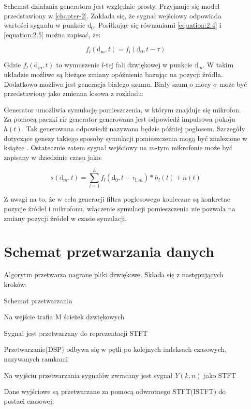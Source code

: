 Schemat działania generatora jest względnie prosty. Przyjmuje się model przedstawiony w \ref{chapter-2}. Zakłada się, że sygnał wejściowy odpowiada wartości sygnału w punkcie $\bm{\mathrm{d}}_{0}$. Posiłkując się równaniami \ref{equation:2.4} i \ref{equation:2.5} można zapisać, że:

\begin{equation}
    \label{equation:delay model}
    f_{l}(\bm{\mathrm{d}}_{m},t) = 
    f_{l}(\bm{\mathrm{d}}_{0},t-\tau)
\end{equation}

\noindent Gdzie $f_{l}(\bm{\mathrm{d}}_{m},t)$ to wymuszenie $l$-tej fali dzwiękowej w punkcie $\bm{\mathrm{d}}_{m}$. W takim układzie możliwe są bieżące zmiany opóźnienia bazując na pozycji źródła. Dodatkowo możliwa jest generacja białego szumu. Biały szum o mocy $\sigma$ może być przedstawiony jako zmienna losowa z rozkładu:


Generator umożliwia symulację pomieszczenia, w  którym znajduje się mikrofon. Za pomocą paczki rir generator \cite{rir} generowana jest odpowiedź impulsowa pokoju $h(t)$. Tak generowana odpowiedź nazywana będzie później pogłosem. Szczegóły dotyczące genezy takiego sposoby symulacji pomieszczenia mogą być znalezione w książce \cite{Kuttruff}. Ostatecznie zatem sygnał wejściowy na $m$-tym mikrofonie może być zapisany w dziedzinie czasu jako:

\begin{equation}
    \label{equation:full generator}
    s(\bm{\mathrm{d}}_{m},t)=
    \sum_{l=1}^{L}
    f_{l}(\bm{\mathrm{d}}_{0},t-\tau_{l,m})*
    h_{l}(t)+ n(t)
\end{equation}

Z uwagi na to, że w celu generacji filtra pogłosowego konieczne są konkretne pozycje źródeł i mikrofonu, włączenie symulacji pomieszczenia nie pozwala na zmiany pozycji źródeł w czasie symulacji.




\section{Schemat przetwarzania danych}

Algorytm przetwarza nagrane pliki dzwiękowe. Składa się z następujących kroków:

\begin{algorithm}
  
  \caption{Schemat przetwarzania}
  \begin{algorithmic}[1]
    \State Na wejście trafia M ścieżek dzwiękowych
    
    \State Sygnał jest przetwarzany do reprezentacji STFT
    
    \State Przetwarzanie(DSP) odbywa się w pętli po kolejnych indeksach czasowych, nazywanych ramkami
    
    \State Na wyjściu przetwarzania sygnałów zwracany jest sygnał $Y(k,n)$ jako STFT
    
    \State Dane wyjściowe są przetwarzane za pomocą odwrotnego STFT(ISTFT) do postaci czasowej.
    
  \end{algorithmic}
\end{algorithm}

